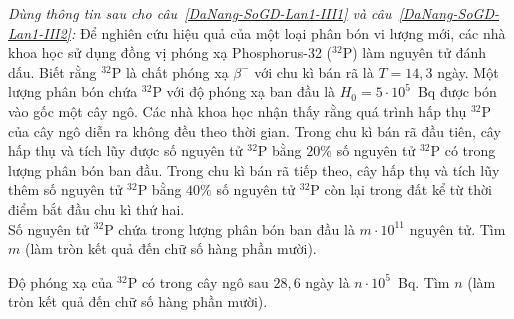 	\begin{ex}%
		\label{DaNang-SoGD-Lan1-III1}
		\textit{Dùng thông tin sau cho câu~\ref{DaNang-SoGD-Lan1-III1} và câu~\ref{DaNang-SoGD-Lan1-III2}:} Để nghiên cứu hiệu quả của một loại phân bón vi lượng mới, các nhà khoa học sử dụng đồng vị phóng xạ Phosphorus-32 (${}^{32}\text{P}$) làm nguyên tử đánh dấu. Biết rằng ${}^{32}\text{P}$ là chất phóng xạ $\beta^-$ với chu kì bán rã là $T=14{,}3$ ngày. Một lượng phân bón chứa ${}^{32}\text{P}$ với độ phóng xạ ban đầu là $H_0=5\cdot 10^5$~Bq được bón vào gốc một cây ngô. Các nhà khoa học nhận thấy rằng quá trình hấp thụ ${}^{32}\text{P}$ của cây ngô diễn ra không đều theo thời gian. Trong chu kì bán rã đầu tiên, cây hấp thụ và tích lũy được số nguyên tử ${}^{32}\text{P}$ bằng $20\%$ số nguyên tử ${}^{32}\text{P}$ có trong lượng phân bón ban đầu. Trong chu kì bán rã tiếp theo, cây hấp thụ và tích lũy thêm số nguyên tử ${}^{32}\text{P}$ bằng $40\%$ số nguyên tử ${}^{32}\text{P}$ còn lại trong đất kể từ thời điểm bắt đầu chu kì thứ hai.\\
		Số nguyên tử ${}^{32}\text{P}$ chứa trong lượng phân bón ban đầu là $m\cdot 10^{11}$ nguyên tử. Tìm $m$ (làm tròn kết quả đến chữ số hàng phần mười).
		\par
	\end{ex}

	\begin{ex}%
		\label{DaNang-SoGD-Lan1-III2}
		Độ phóng xạ của ${}^{32}\text{P}$ có trong cây ngô sau $28{,}6$ ngày là $n\cdot 10^5$~Bq. Tìm $n$ (làm tròn kết quả đến chữ số hàng phần mười).
		\par
	\end{ex}


